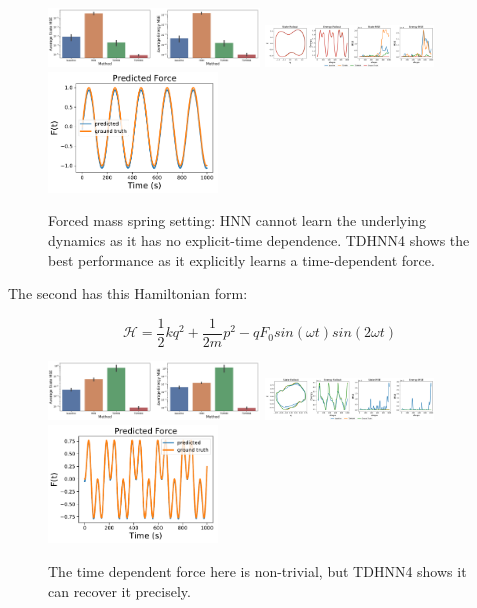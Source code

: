 \documentclass[twoside]{article}
\begin{document}
\begin{figure}[h!]
\centering
\includegraphics[width=0.5\textwidth]{figures/mass_spring_forced_1_errors.pdf}
\includegraphics[width=0.4\textwidth]{figures/mass_spring_forced_1_pred.pdf}
\includegraphics[width=0.4\textwidth]{figures/TDHNN4_mass_spring_force_1.pdf}
\caption{Forced mass spring setting: HNN cannot learn the underlying dynamics as it has no explicit-time dependence. TDHNN4 shows the best performance as it explicitly learns a time-dependent force.}
\end{figure}

The second has this Hamiltonian form:

\begin{equation}
\mathcal{H} = \frac{1}{2}kq^2 + \frac{1}{2m}p^2 - qF_0sin(\omega t)sin(2\omega t)
\end{equation}

\begin{figure}[h!]
\centering
\includegraphics[width=0.5\textwidth]{figures/mass_spring_forced_2_errors.pdf}
\includegraphics[width=0.4\textwidth]{figures/mass_spring_forced_2_pred.pdf}
\includegraphics[width=0.4\textwidth]{figures/TDHNN4_mass_spring_force_2.pdf}
\caption{The time dependent force here is non-trivial, but TDHNN4 shows it can recover it precisely.}
\end{figure}
\end{document}
